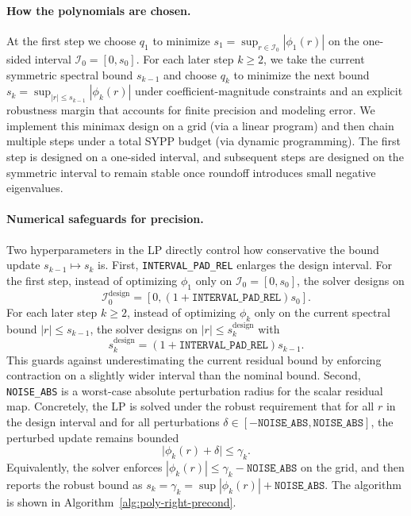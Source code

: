 \documentclass[11pt]{article}
\begin{document}
\paragraph{How the polynomials are chosen.}
At the first step we choose $q_1$ to minimize $s_1=\sup_{r\in\mathcal{I}_0}|\phi_1(r)|$ on the one-sided interval $\mathcal{I}_0=[0,s_0]$. For each later step $k\ge 2$, we take the current symmetric spectral bound $s_{k-1}$ and choose $q_k$ to minimize
the next bound $s_k=\sup_{|r|\le s_{k-1}}|\phi_k(r)|$ under coefficient-magnitude constraints and an explicit robustness margin
that accounts for finite precision and modeling error. We implement this minimax design on a grid (via a linear
program) and then chain multiple steps under a total SYPP budget (via dynamic programming). The first step is designed on a
one-sided interval, and subsequent steps are designed on the symmetric interval to remain stable once roundoff introduces
small negative eigenvalues.

\paragraph{Numerical safeguards for precision.}
Two hyperparameters in the LP directly control how conservative the bound update $s_{k-1}\mapsto s_k$ is.
First, \texttt{INTERVAL\_PAD\_REL} enlarges the design interval. For the first step, instead of optimizing $\phi_1$ only on $\mathcal{I}_0=[0,s_0]$, the solver designs on
\[
\mathcal{I}_0^{\mathrm{design}}=[0,(1+\texttt{INTERVAL\_PAD\_REL})s_0].
\]
For each later step $k\ge 2$, instead of optimizing $\phi_k$ only on the current spectral
bound $|r|\le s_{k-1}$, the solver designs on $|r|\le s_k^{\mathrm{design}}$ with
\[
s_k^{\mathrm{design}}  =  (1+\texttt{INTERVAL\_PAD\_REL}) s_{k-1}.
\]
This guards against underestimating the current residual bound by enforcing contraction on a slightly wider interval than
the nominal bound.
Second, \texttt{NOISE\_ABS} is a worst-case absolute perturbation radius for the scalar residual map. Concretely, the LP is
solved under the robust requirement that for all $r$ in the design interval and for all perturbations
$\delta\in[-\texttt{NOISE\_ABS}, \texttt{NOISE\_ABS}]$, the perturbed update remains bounded
\[
\bigl|\phi_k(r)+\delta\bigr|  \le  \gamma_k.
\]
Equivalently, the solver enforces $|\phi_k(r)|\le \gamma_k-\texttt{NOISE\_ABS}$ on the grid, and then reports the robust bound
as $s_k=\gamma_k=\sup|\phi_k(r)|+\texttt{NOISE\_ABS}$. 
The algorithm is shown in Algorithm~\ref{alg:poly-right-precond}.
\end{document}
